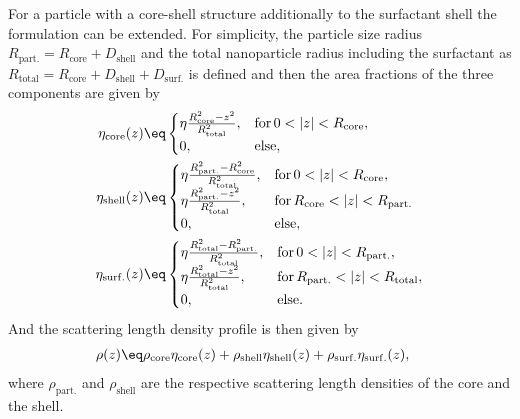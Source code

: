 \documentclass[\main/dresen_thesis.tex]{subfiles}
\begin{document}
    For a particle with a core-shell structure additionally to the surfactant shell the formulation can be extended.
    For simplicity, the particle size radius $R_\mathrm{part.} = R_\mathrm{core} + D_\mathrm{shell}$ and the total nanoparticle radius including the surfactant as $R_\mathrm{total} = R_\mathrm{core} + D_\mathrm{shell} + D_\mathrm{surf.}$ is defined and then the area fractions of the three components are given by
    \begin{align}
      \eta_\mathrm{core} (z)
        &\eq \begin{cases}
        \eta \frac{R_\mathrm{core}^{2} - z^2}{R_\mathrm{total}^2}, &\mathrm{for\,}0 < |z|<R_\mathrm{core}, \\
        0,                                               &\mathrm{else},
        \end{cases}\\
      \eta_\mathrm{shell} (z)
        &\eq \begin{cases}
          \eta \frac{R_\mathrm{part.}^2 - R_\mathrm{core}^2}{R_\mathrm{total}^2}, &\mathrm{for\,}0 < |z|<R_\mathrm{core}, \\
          \eta \frac{R_\mathrm{part.}^2 - z^2}{R_\mathrm{total}^2}, &\mathrm{for\,}R_\mathrm{core}<|z|<R_\mathrm{part.} \\
          0,                                            &\mathrm{else},
        \end{cases}\\
      \eta_\mathrm{surf.} (z)
        &\eq \begin{cases}
          \eta \frac{R_\mathrm{total}^2 - R_\mathrm{part.}^2}{R_\mathrm{total}^2}, &\mathrm{for\,}0<|z|<R_\mathrm{part.}, \\
          \eta \frac{R_\mathrm{total}^2 - z^2}{R_\mathrm{total}^2}, &\mathrm{for\,}R_\mathrm{part.} < |z| < R_\mathrm{total}, \\
          0,                                            &\mathrm{else}.
        \end{cases}
    \end{align}
    And the scattering length density profile is then given by
    \begin{align}
      \label{eq:looselyPackedNP:layerCharacterization:sldFromAreaFractionCoreShell}
        \rho(z) \eq& \rho_\mathrm{core} \eta_\mathrm{core}(z) + \rho_\mathrm{shell} \eta_\mathrm{shell}(z) + \rho_\mathrm{surf.} \eta_\mathrm{surf.}(z),
    \end{align}
    where $\rho_\mathrm{part.}$ and $\rho_\mathrm{shell}$ are the respective scattering length densities of the core and the shell.
\end{document}
